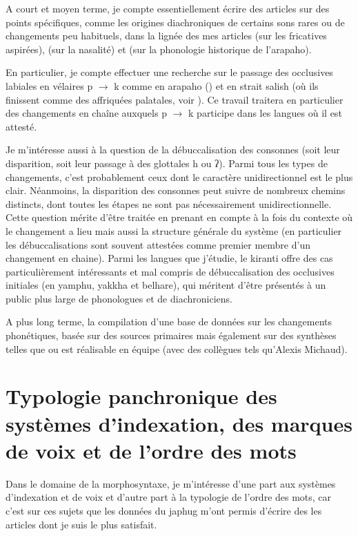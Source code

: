 \documentclass[oldfontcommands,oneside,a4paper,11pt]{article}
\newcommand{\ipa}[1]{{\phon #1}} %
\begin{document}
A court et moyen terme, je compte essentiellement écrire des articles sur des points spécifiques, comme les origines diachroniques de certains sons rares ou de changements peu habituels, dans la lignée des mes articles \citet{jacques11lingua} (sur les fricatives aspirées), \citet{michaud-jacques12nasalite} (sur la nasalité) et \citet{jacques13arapaho} (sur la phonologie historique de l'arapaho). 

En particulier, je compte effectuer une recherche sur le passage des occlusives labiales en vélaires \ipa{*p} $\rightarrow$ \ipa{k}  comme en arapaho (\citealt{goddard74arapaho}) et en strait salish (où ils finissent comme des affriquées palatales, voir \citealt[10-11]{kuipers02salish}). Ce travail traitera en particulier des changements en chaîne auxquels \ipa{*p} $\rightarrow$ \ipa{k}  participe dans les langues où il est attesté.

Je m'intéresse aussi à la question de la débuccalisation des consonnes (soit leur disparition, soit leur passage à des glottales \ipa{h} ou \ipa{ʔ}). Parmi tous les types de changements, c'est probablement ceux dont le caractère unidirectionnel est le plus clair. Néanmoins, la disparition des consonnes peut suivre de nombreux chemins distincts, dont toutes les étapes ne sont pas nécessairement unidirectionnelle. Cette question mérite d'être traitée en prenant en compte à la fois du contexte où le changement a lieu mais aussi la structure générale du système (en particulier les débuccalisations sont souvent attestées comme premier membre d'un changement en chaine). Parmi les langues que j'étudie, le kiranti offre des cas particulièrement intéressants et mal compris de débuccalisation des occlusives initiales (en yamphu, yakkha et belhare), qui méritent d'être présentés à un public plus large de phonologues et de diachroniciens.


A plus long terme, la compilation d'une base de données sur les changements phonétiques, basée sur des sources primaires mais également sur des synthèses telles que  \citet{kuemmel07wandel} ou \citet{blevins04evolutionary, blevins08naturalness} est réalisable en équipe (avec des collègues tels qu'Alexis Michaud).

 

\section{Typologie panchronique des systèmes d'indexation, des marques de voix et de l'ordre des mots}
Dans le domaine de la morphosyntaxe, je m'intéresse d'une part aux systèmes d'indexation et de voix et d'autre part à la typologie de l'ordre des mots, car c'est sur ces sujets que les données du japhug m'ont permis d'écrire des les articles dont je suis le plus satisfait.
\end{document}
